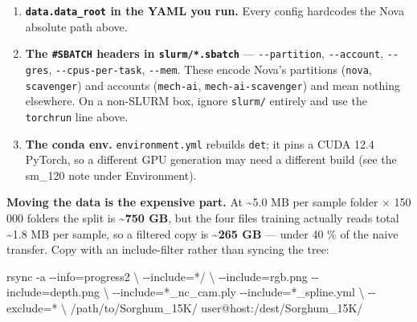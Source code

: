 \documentclass[
  10pt,
]{article}
\newenvironment{Shaded}{}{}
\newcommand{\AttributeTok}[1]{\textcolor[rgb]{0.49,0.56,0.16}{#1}}
\newcommand{\DataTypeTok}[1]{\textcolor[rgb]{0.56,0.13,0.00}{#1}}
\newcommand{\FunctionTok}[1]{\textcolor[rgb]{0.02,0.16,0.49}{#1}}
\newcommand{\NormalTok}[1]{#1}
\newcommand{\OperatorTok}[1]{\textcolor[rgb]{0.40,0.40,0.40}{#1}}
\newcommand{\StringTok}[1]{\textcolor[rgb]{0.25,0.44,0.63}{#1}}
\providecommand{\tightlist}{%
  \setlength{\itemsep}{0pt}\setlength{\parskip}{0pt}}
\begin{document}
\begin{enumerate}
\def\labelenumi{\arabic{enumi}.}
\tightlist
\item
  \textbf{\texttt{data.data\_root} in the YAML you run.} Every config
  hardcodes the Nova absolute path above.
\item
  \textbf{The \texttt{\#SBATCH} headers in \texttt{slurm/*.sbatch}} ---
  \texttt{-\/-partition}, \texttt{-\/-account}, \texttt{-\/-gres},
  \texttt{-\/-cpus-per-task}, \texttt{-\/-mem}. These encode Nova's
  partitions (\texttt{nova}, \texttt{scavenger}) and accounts
  (\texttt{mech-ai}, \texttt{mech-ai-scavenger}) and mean nothing
  elsewhere. On a non-SLURM box, ignore \texttt{slurm/} entirely and use
  the \texttt{torchrun} line above.
\item
  \textbf{The conda env.} \texttt{environment.yml} rebuilds
  \texttt{det}; it pins a CUDA 12.4 PyTorch, so a different GPU
  generation may need a different build (see the sm\_120 note under
  Environment).
\end{enumerate}

\textbf{Moving the data is the expensive part.} At \textasciitilde5.0 MB
per sample folder × 150 000 folders the split is
\textbf{\textasciitilde750 GB}, but the four files training actually
reads total \textasciitilde1.8 MB per sample, so a filtered copy is
\textbf{\textasciitilde265 GB} --- under 40 \% of the naive transfer.
Copy with an include-filter rather than syncing the tree:

\begin{Shaded}
\begin{Highlighting}[]
\FunctionTok{rsync} \AttributeTok{{-}a} \AttributeTok{{-}{-}info}\OperatorTok{=}\NormalTok{progress2 }\DataTypeTok{\textbackslash{}}
  \AttributeTok{{-}{-}include}\OperatorTok{=}\StringTok{\textquotesingle{}*/\textquotesingle{}} \DataTypeTok{\textbackslash{}}
  \AttributeTok{{-}{-}include}\OperatorTok{=}\StringTok{\textquotesingle{}rgb.png\textquotesingle{}} \AttributeTok{{-}{-}include}\OperatorTok{=}\StringTok{\textquotesingle{}depth.png\textquotesingle{}} \DataTypeTok{\textbackslash{}}
  \AttributeTok{{-}{-}include}\OperatorTok{=}\StringTok{\textquotesingle{}*\_nc\_cam.ply\textquotesingle{}} \AttributeTok{{-}{-}include}\OperatorTok{=}\StringTok{\textquotesingle{}*\_spline.yml\textquotesingle{}} \DataTypeTok{\textbackslash{}}
  \AttributeTok{{-}{-}exclude}\OperatorTok{=}\StringTok{\textquotesingle{}*\textquotesingle{}} \DataTypeTok{\textbackslash{}}
\NormalTok{  /path/to/Sorghum\_15K/ user@host:/dest/Sorghum\_15K/}
\end{Highlighting}
\end{Shaded}
\end{document}
